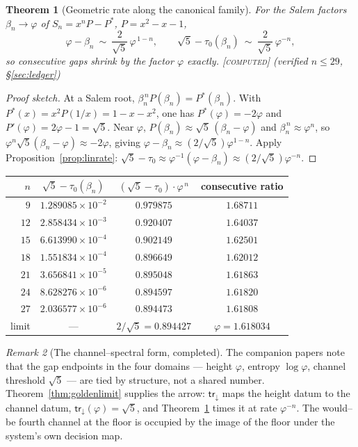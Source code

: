 \documentclass[11pt]{article}
\theoremstyle{plain}
\newtheorem{theorem}{Theorem}[section]
\theoremstyle{definition}
\theoremstyle{remark}
\newtheorem{remark}[theorem]{Remark}
\newcommand{\computed}{\textcolor{forcedc}{\textsc{[computed]}}}
\newcommand{\trace}{\mathsf{tr}_{\!\downarrow}}
\begin{document}
\begin{theorem}[Geometric rate along the canonical family]\label{thm:georate}
For the Salem factors $\beta_n\to\varphi$ of $S_n=x^nP-P^*$, $P=x^2-x-1$,
\[
\varphi-\beta_n\ \sim\ \frac{2}{\sqrt5}\,\varphi^{\,1-n},
\qquad
\sqrt5-\tau_0(\beta_n)\ \sim\ \frac{2}{\sqrt5}\,\varphi^{-n},
\]
so consecutive gaps shrink by the factor $\varphi$ exactly. \computed{} {\small(verified $n\le29$, \S\ref{sec:ledger})}
\end{theorem}
\begin{proof}[Proof sketch]
At a Salem root, $\beta_n^{\,n}P(\beta_n)=P^*(\beta_n)$. With $P^*(x)=x^2P(1/x)=1-x-x^2$, one has $P^*(\varphi)=-2\varphi$ and $P'(\varphi)=2\varphi-1=\sqrt5$. Near $\varphi$, $P(\beta_n)\approx\sqrt5\,(\beta_n-\varphi)$ and $\beta_n^{\,n}\approx\varphi^n$, so $\varphi^n\sqrt5(\beta_n-\varphi)\approx-2\varphi$, giving $\varphi-\beta_n\approx(2/\sqrt5)\varphi^{1-n}$. Apply Proposition~\ref{prop:linrate}: $\sqrt5-\tau_0\approx\varphi^{-1}(\varphi-\beta_n)\approx(2/\sqrt5)\varphi^{-n}$.
\end{proof}

\begin{center}
\renewcommand{\arraystretch}{1.15}
\begin{tabular}{@{}rccc@{}}
\toprule
$n$ & $\sqrt5-\tau_0(\beta_n)$ & $(\sqrt5-\tau_0)\cdot\varphi^{\,n}$ & consecutive ratio\\
\midrule
$9$  & $1.289085\times10^{-2}$ & $0.979875$ & $1.68711$\\
$12$ & $2.858434\times10^{-3}$ & $0.920407$ & $1.64037$\\
$15$ & $6.613990\times10^{-4}$ & $0.902149$ & $1.62501$\\
$18$ & $1.551834\times10^{-4}$ & $0.896649$ & $1.62012$\\
$21$ & $3.656841\times10^{-5}$ & $0.895048$ & $1.61863$\\
$24$ & $8.628276\times10^{-6}$ & $0.894597$ & $1.61820$\\
$27$ & $2.036577\times10^{-6}$ & $0.894473$ & $1.61808$\\
\midrule
limit & --- & $2/\sqrt5=0.894427$ & $\varphi=1.618034$\\
\bottomrule
\end{tabular}
\end{center}

\begin{remark}[The channel--spectral form, completed]\label{rem:closed}
The companion papers note that the gap endpoints in the four domains --- height $\varphi$, entropy $\log\varphi$, channel threshold $\sqrt5$ --- are tied by structure, not a shared number. Theorem~\ref{thm:goldenlimit} supplies the arrow: $\trace$ maps the height datum to the channel datum, $\trace(\varphi)=\sqrt5$, and Theorem~\ref{thm:georate} times it at rate $\varphi^{-n}$. The would--be fourth channel at the floor is occupied by the image of the floor under the system's own decision map.
\end{remark}
\end{document}
